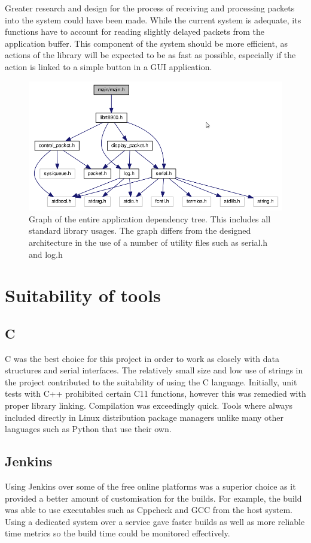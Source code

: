 Greater research and design for the process of receiving and processing packets into the system could have been made. While the current system is adequate, its functions have to account for reading slightly delayed packets from the application buffer. This component of the system should be more efficient, as actions of the library will be expected to be as fast as possible, especially if the action is linked to a simple button in a GUI application.

\begin{figure}[h!]
    \centering
    \includegraphics[width=1\textwidth]{img/dependancy_graph.png}
    \caption[Dependency graph]{Graph of the entire application dependency tree. This includes all standard library usages. The graph differs from the designed architecture in the use of a number of utility files such as serial.h and log.h}
    \label{fig:dependency_graph}
\end{figure}

\section{Suitability of tools}
\subsection*{C}
C was the best choice for this project in order to work as closely with data structures and serial interfaces. The relatively small size and low use of strings in the project contributed to the suitability of using the C language. Initially, unit tests with C++ prohibited certain C11 functions, however this was remedied with proper library linking. Compilation was exceedingly quick. Tools where always included directly in Linux distribution package managers unlike many other languages such as Python that use their own. 

\subsection*{Jenkins}
Using Jenkins over some of the free online platforms was a superior choice as it provided a better amount of customisation for the builds. For example, the build was able to use executables such as Cppcheck and GCC from the host system. Using a dedicated system over a service gave faster builds as well as more reliable time metrics so the build time could be monitored effectively.

